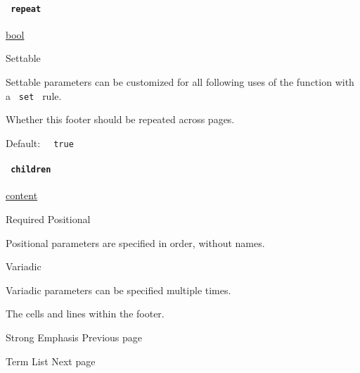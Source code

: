 \paragraph{\texorpdfstring{\texttt{\ repeat\ }}{ repeat }}\label{definitions-footer-repeat}

\href{/docs/reference/foundations/bool/}{bool}

{{ Settable }}

\label{definitions-footer-repeat-settable-tooltip}
Settable parameters can be customized for all following uses of the
function with a \texttt{\ set\ } rule.

Whether this footer should be repeated across pages.

Default: \texttt{\ }{\texttt{\ true\ }}\texttt{\ }

\paragraph{\texorpdfstring{\texttt{\ children\ }}{ children }}\label{definitions-footer-children}

\href{/docs/reference/foundations/content/}{content}

{Required} {{ Positional }}

\label{definitions-footer-children-positional-tooltip}
Positional parameters are specified in order, without names.

{{ Variadic }}

\label{definitions-footer-children-variadic-tooltip}
Variadic parameters can be specified multiple times.

The cells and lines within the footer.

\href{/docs/reference/model/strong/}{\pandocbounded{}}

{ Strong Emphasis } { Previous page }

\href{/docs/reference/model/terms/}{\pandocbounded{}}

{ Term List } { Next page }
